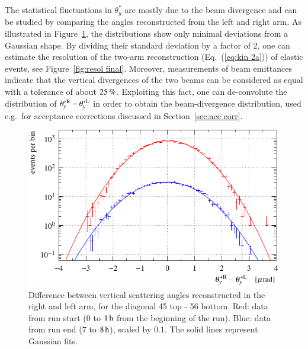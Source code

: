 The statistical fluctuations in $\theta_y^*$ are mostly due to the beam divergence and can be studied by comparing the angles reconstructed from the left and right arm. As illustrated in Figure~\ref{fig:beam div vert}, the distributions show only minimal deviations from a Gaussian shape.
%
By dividing their standard deviation by a factor of 2, one can estimate the resolution of the two-arm reconstruction (Eq.~(\ref{eq:kin 2a})) of elastic events, see Figure~\ref{fig:resol final}.
%
Moreover, measurements of beam emittances \cite{op-elog} indicate that the vertical divergences of the two beams can be considered as equal with a tolerance of about $25\,{\rm \%}$. Exploiting this fact, one can de-convolute the distribution of $\theta_y^{*\rm R} - \theta_y^{*\rm L}$ in order to obtain the beam-divergence distribution, used e.g.~for acceptance corrections discussed in Section~\ref{sec:acc corr}.

\begin{figure}
\begin{center}
\includegraphics{fig/beam_divergence_fits.pdf}
\caption{%
Difference between vertical scattering angles reconstructed in the right and left arm, for the diagonal 45 top - 56 bottom. Red: data from run start ($0$ to $1\,{\rm h}$ from the beginning of the run). Blue: data from run end ($7$ to $8\,{\rm h}$), scaled by $0.1$. The solid lines represent Gaussian fits.
}
\label{fig:beam div vert}
\end{center}
\end{figure}


